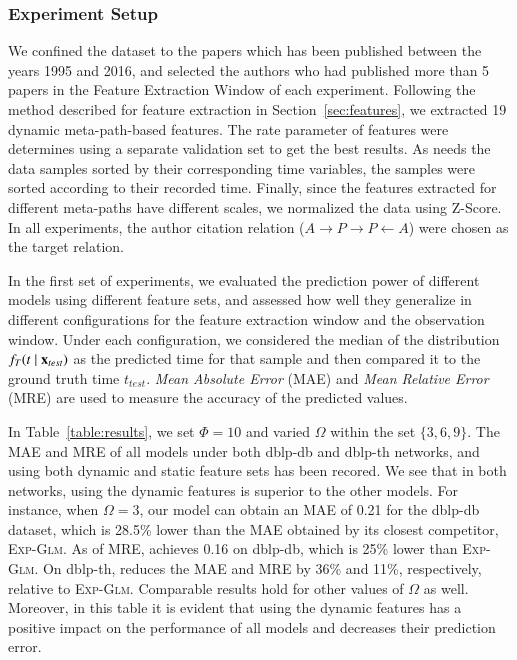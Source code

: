 \subsubsection{Experiment Setup}
We confined the dataset to the papers which has been published between the years 1995 and 2016, and selected the authors who had published more than 5 papers in the Feature Extraction Window of each experiment. Following the method described for feature extraction in Section~\ref{sec:features}, we extracted 19 dynamic meta-path-based features. The rate parameter of features were determines using a separate validation set to get the best results. As \npglm needs the data samples sorted by their corresponding time variables, the samples were sorted according to their recorded time. Finally, since the features extracted for different meta-paths have different scales, we normalized the data using Z-Score. In all experiments, the author citation relation ($A\rightarrow P\rightarrow P\leftarrow A$) were chosen as the target relation.



In the first set of experiments, we evaluated the prediction power of different models using different feature sets, and assessed how well they generalize in different configurations for the feature extraction window and the observation window. Under each configuration, we considered the median of the distribution $f_T(t\mid \mathbf{x}_{test})$ as the predicted time for that sample and then compared it to the ground truth time $t_{test}$. \emph{Mean Absolute Error} (MAE) and \emph{Mean Relative Error} (MRE) are used to measure the accuracy of the predicted values.  

In Table~\ref{table:results}, we set $\Phi=10$ and varied $\Omega$ within the set $\{3,6,9\}$. The MAE and MRE of all models under both dblp-db and dblp-th networks, and using both dynamic and static feature sets has been recored. We see that in both networks, \npglm using the dynamic features is superior to the other models. For instance, when $\Omega=3$, our model \npglm can obtain an MAE of 0.21 for the dblp-db dataset, which is 28.5\% lower than the MAE obtained by its closest competitor, \textsc{Exp-Glm}. As of MRE, \npglm achieves 0.16 on dblp-db, which is 25\% lower than \textsc{Exp-Glm}. 
On dblp-th, \npglm reduces the MAE and MRE by 36\% and 11\%, respectively, relative to \textsc{Exp-Glm}. Comparable results hold for other values of $\Omega$ as well. Moreover, in this table it is evident that using the dynamic features has a positive impact on the performance of all models and decreases their prediction error.

